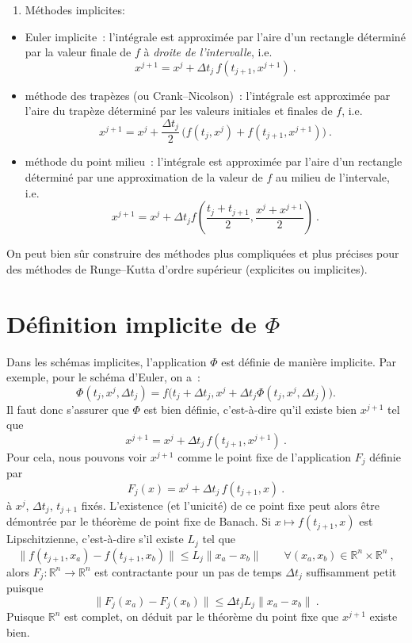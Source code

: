 \begin{enumerate}
\def\labelenumi{\arabic{enumi}.}
\setcounter{enumi}{1}
\tightlist
\item
  Méthodes implicites:
\end{enumerate}

\begin{itemize}
\item
  Euler implicite~: l'intégrale est approximée par l'aire d'un rectangle
  déterminé par la valeur finale de \(f\) à \emph{droite de
  l'intervalle}, i.e.\\
  \[
    x^{j+1} = x^j + {\Delta t}_j \, f(t_{j+1},x^{j+1}) \ .
    \]
\item
  méthode des trapèzes (ou Crank--Nicolson)~: l'intégrale est approximée
  par l'aire du trapèze déterminé par les valeurs initiales et finales
  de \(f\), i.e.~ \[
  x^{j+1} = x^j+\frac{{\Delta t}_j}{2} \, \Big( f(t_j,x^j) + f(t_{j+1},x^{j+1})\Big) \ .
  \]
\item
  méthode du point milieu~: l'intégrale est approximée par l'aire d'un
  rectangle déterminé par une approximation de la valeur de \(f\) au
  milieu de l'intervale, i.e. \[
    x^{j+1} = x^j + {\Delta t}_j f\left(\frac{t_j+t_{j+1}}{2}, \frac{x^j+x^{j+1}}{2}\right) \ .
    \]
\end{itemize}

On peut bien sûr construire des méthodes plus compliquées et plus
précises pour des méthodes de Runge--Kutta d'ordre supérieur (explicites
ou implicites).

\hypertarget{ed2-sec_def_impl}{%
\section{\texorpdfstring{Définition implicite de
\(\Phi\)}{Définition implicite de \textbackslash Phi}}\label{ed2-sec_def_impl}}

Dans les schémas implicites, l'application \(\Phi\) est définie de
manière implicite. Par exemple, pour le schéma d'Euler, on a~: \[
\Phi(t_j,x^j,{\Delta t}_j) = f\Big(t_j + {\Delta t}_j, x^j + {\Delta t}_j\Phi(t_j,x^j,{\Delta t}_j) \Big).
\] Il faut donc s'assurer que \(\Phi\) est bien définie, c'est-à-dire
qu'il existe bien \(x^{j+1}\) tel que \[
x^{j+1} = x^j + {\Delta t}_j \, f(t_{j+1},x^{j+1}) \ .
\] Pour cela, nous pouvons voir \(x^{j+1}\) comme le point fixe de
l'application \(F_j\) définie par \[
F_j(x) = x^j + {\Delta t}_j \, f(t_{j+1},x) \ .
\] à \(x^j\), \({\Delta t}_j\), \(t_{j+1}\) fixés. L'existence (et
l'unicité) de ce point fixe peut alors être démontrée par le théorème de
point fixe de Banach. Si \(x\mapsto f(t_{j+1},x)\) est Lipschitzienne,
c'est-à-dire s'il existe \(L_j\) tel que \[
\|f(t_{j+1},x_a)-f(t_{j+1},x_b)\| \leq L_j \|x_a-x_b\| \qquad \forall (x_a,x_b)\in \mathbb{R}^n\times \mathbb{R}^n \ ,
\] alors \(F_j:\mathbb{R}^n \to \mathbb{R}^n\) est contractante pour un
pas de temps \({\Delta t}_j\) suffisamment petit puisque \[
\|F_j(x_a)-F_j(x_b)\| \leq  {\Delta t}_j L_j \|x_a-x_b\| \ .
\] Puisque \(\mathbb{R}^n\) est complet, on déduit par le théorème du
point fixe que \(x^{j+1}\) existe bien.

